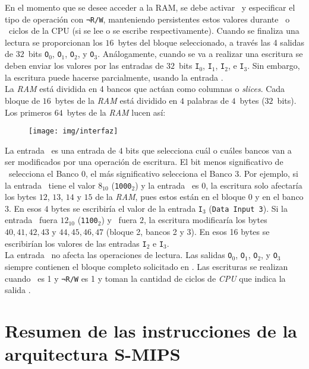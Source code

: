 \documentclass[12pt]{amsart}
\begin{document}
	En el momento que se desee acceder a la RAM, se debe activar \CS\ y especificar el tipo de operación con \texttt{¬R/W}, manteniendo persistentes estos valores durante \RT\ o \WT\ ciclos de la CPU (si se lee o se escribe respectivamente). Cuando se finaliza una lectura se proporcionan los $16$~bytes del bloque seleccionado, a través las 4 salidas de $32$~bits \texttt{O}$_0$, \texttt{O}$_1$, \texttt{O}$_2$, y \texttt{O}$_3$. Análogamente, cuando se va a realizar una escritura se deben enviar los valores por las entradas de $32$~bits \texttt{I}$_0$, \texttt{I}$_1$, \texttt{I}$_2$, e \texttt{I}$_3$. Sin embargo, la escritura puede hacerse parcialmente, usando la entrada \MASK.\\

	La \textit{RAM} está dividida en 4 bancos que actúan como columnas o \textit{slices}. Cada bloque de $16$~bytes de la \textit{RAM} está dividido en $4$ palabras de $4$~bytes ($32$~bits). Los primeros $64$~bytes de la \textit{RAM} lucen así:
	\begin{figure}[H]
		\centering
		\texttt{[image: img/interfaz]}
		\label{fig:interfaz}
	\end{figure}

	La entrada \MASK\ es una entrada de $4$ bits que selecciona cuál o cuáles bancos van a ser modificados por una operación de escritura. El bit menos significativo de \MASK\ selecciona el Banco 0, el más significativo selecciona el Banco 3. Por ejemplo, si la entrada \MASK\ tiene el valor $8_{10}$ (\texttt{1000}$_2$) y la entrada \ADDR\ es $0$, la escritura solo afectaría los bytes $12$, $13$, $14$ y $15$ de la \textit{RAM}, pues estos están en el bloque $0$ y en el banco $3$. En esos $4$ bytes se escribiría el valor de la entrada \texttt{I}$_3$ (\texttt{Data Input 3}). Si la entrada \MASK\ fuera $12_{10}$ (\texttt{1100}$_2$) y \ADDR\ fuera $2$, la escritura modificaría los bytes $40, 41, 42, 43$ y $44, 45, 46, 47$ (bloque 2, bancos 2 y 3). En esos 16 bytes se escribirían los valores de las entradas \texttt{I}$_2$ e \texttt{I}$_3$.\\
	
	La entrada \MASK\ no afecta las operaciones de lectura. Las salidas \texttt{O}$_0$, \texttt{O}$_1$, \texttt{O}$_2$, y \texttt{O}$_3$ siempre contienen el bloque completo solicitado en \ADDR. Las escrituras se realizan cuando \CS\ es 1 y \texttt{¬R/W} es 1 y toman la cantidad de ciclos de \textit{CPU} que indica la salida \WT.
	

\section{Resumen de las instrucciones de la arquitectura S-MIPS}
\end{document}
